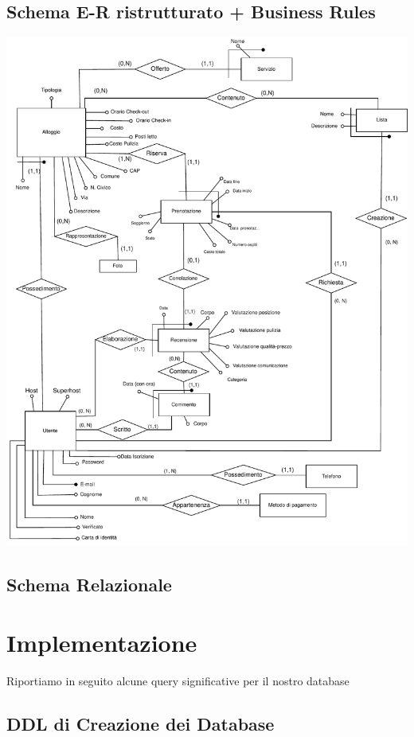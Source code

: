 \documentclass[letterpaper]{report}
\begin{document}
\section{Schema E-R ristrutturato + Business Rules}
\includegraphics[width=\textwidth]{resources/pdf/ER-Ristrutturato.pdf}
\clearpage


\clearpage
\section{Schema Relazionale}


\chapter{Implementazione}

Riportiamo in seguito alcune query significative per il nostro database

\section{DDL di Creazione dei Database}












\end{document}
